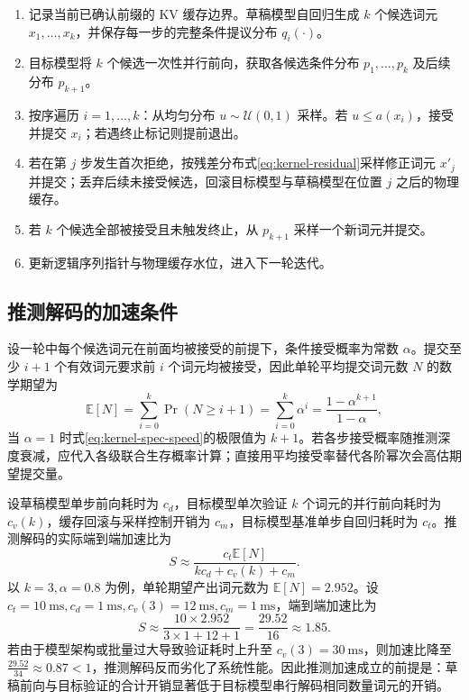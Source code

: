 \documentclass[../textbook.tex]{subfiles}
\begin{document}
\begin{algorithm}[保持目标分布的推测解码]
\begin{enumerate}
\item 记录当前已确认前缀的 KV 缓存边界。草稿模型自回归生成 $k$ 个候选词元 $x_{1},\ldots,x_{k}$，并保存每一步的完整条件提议分布 $q_i(\cdot)$。
\item 目标模型将 $k$ 个候选一次性并行前向，获取各候选条件分布 $p_1,\ldots,p_k$ 及后续分布 $p_{k+1}$。
\item 按序遍历 $i=1,\ldots,k$：从均匀分布 $u\sim\mathcal{U}(0,1)$ 采样。若 $u\le a(x_i)$，接受并提交 $x_i$；若遇终止标记则提前退出。
\item 若在第 $j$ 步发生首次拒绝，按残差分布式\eqref{eq:kernel-residual}采样修正词元 $x'_j$ 并提交；丢弃后续未接受候选，回滚目标模型与草稿模型在位置 $j$ 之后的物理缓存。
\item 若 $k$ 个候选全部被接受且未触发终止，从 $p_{k+1}$ 采样一个新词元并提交。
\item 更新逻辑序列指针与物理缓存水位，进入下一轮迭代。
\end{enumerate}
\end{algorithm}

\subsection{推测解码的加速条件}

设一轮中每个候选词元在前面均被接受的前提下，条件接受概率为常数 $\alpha$。提交至少 $i+1$ 个有效词元要求前 $i$ 个词元均被接受，因此单轮平均提交词元数 $N$ 的数学期望为
\begin{equation}
 \mathbb E[N]=\sum_{i=0}^k\Pr(N\ge i+1)
 =\sum_{i=0}^k\alpha^i
 =\frac{1-\alpha^{k+1}}{1-\alpha},
 \label{eq:kernel-spec-speed}
\end{equation}
当 $\alpha=1$ 时式\eqref{eq:kernel-spec-speed}的极限值为 $k+1$。若各步接受概率随推测深度衰减，应代入各级联合生存概率计算；直接用平均接受率替代各阶幂次会高估期望提交量。

设草稿模型单步前向耗时为 $c_d$，目标模型单次验证 $k$ 个词元的并行前向耗时为 $c_v(k)$，缓存回滚与采样控制开销为 $c_m$，目标模型基准单步自回归耗时为 $c_t$。推测解码的实际端到端加速比为
\begin{equation}
 S\approx\frac{c_t\mathbb E[N]}{k c_d+c_v(k)+c_m}.
\end{equation}
以 $k=3,\alpha=0.8$ 为例，单轮期望产出词元数为 $\mathbb{E}[N]=2.952$。设 $c_t=\qty{10}{\milli\second}, c_d=\qty{1}{\milli\second}, c_v(3)=\qty{12}{\milli\second}, c_m=\qty{1}{\milli\second}$，端到端加速比为
\begin{equation*}
 S\approx\frac{10\times 2.952}{3\times 1+12+1}=\frac{29.52}{16}\approx 1.85.
\end{equation*}
若由于模型架构或批量过大导致验证耗时上升至 $c_v(3)=\qty{30}{\milli\second}$，则加速比降至 $\frac{29.52}{34}\approx 0.87<1$，推测解码反而劣化了系统性能。因此推测加速成立的前提是：草稿前向与目标验证的合计开销显著低于目标模型串行解码相同数量词元的开销。
\end{document}

